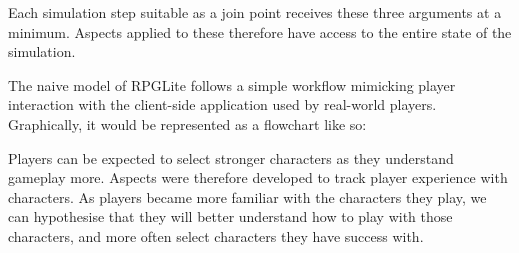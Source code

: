 Each simulation step suitable as a join point receives these three arguments at
a minimum. Aspects applied to these therefore have access to the entire state of
the simulation.

The naive model of RPGLite follows a simple workflow mimicking player
interaction with the client-side application used by real-world players.
Graphically, it would be represented as a flowchart like so:






Players can be expected to select stronger characters as they understand
gameplay more. Aspects were therefore developed to track player experience with
characters. As players became more familiar with the characters they play, we
can hypothesise that they will better understand how to play with those
characters, and more often select characters they have success with. 




